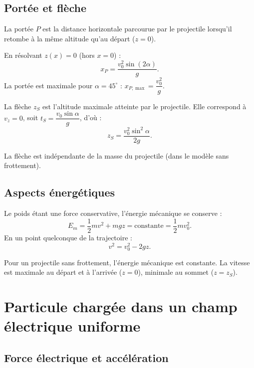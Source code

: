 \subsection{Portée et flèche}

\begin{definition}[Portée]
La portée $P$ est la distance horizontale parcourue par le projectile lorsqu’il retombe à la même altitude qu’au départ ($z=0$).
\end{definition}

En résolvant $z(x)=0$ (hors $x=0$) :
\[
x_P = \frac{v_0^2\sin(2\alpha)}{g}.
\]
La portée est maximale pour $\alpha=45^\circ$ : $x_{P,\max} = \dfrac{v_0^2}{g}$.

\begin{definition}[Flèche]
La flèche $z_S$ est l’altitude maximale atteinte par le projectile. Elle correspond à $v_z=0$, soit $t_S = \dfrac{v_0\sin\alpha}{g}$, d’où :
\[
z_S = \frac{v_0^2\sin^2\alpha}{2g}.
\]
\end{definition}

\begin{remarque}
La flèche est indépendante de la masse du projectile (dans le modèle sans frottement).
\end{remarque}

\subsection{Aspects énergétiques}

Le poids étant une force conservative, l’énergie mécanique se conserve :
\[
E_m = \frac12 m v^2 + mgz = \text{constante} = \frac12 m v_0^2.
\]
En un point quelconque de la trajectoire :
\[
v^2 = v_0^2 - 2gz.
\]

\begin{aretenir}
Pour un projectile sans frottement, l’énergie mécanique est constante. La vitesse est maximale au départ et à l’arrivée ($z=0$), minimale au sommet ($z=z_S$).
\end{aretenir}

\section{Particule chargée dans un champ électrique uniforme}

\subsection{Force électrique et accélération}

